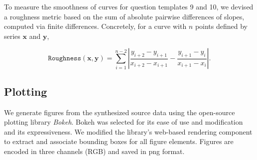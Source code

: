 \documentclass{article} \usepackage{iclr2018_workshop,times}
\begin{document}
To measure the smoothness of curves for question templates 9 and 10, we devised a roughness metric based on the sum of absolute pairwise differences of slopes, computed via finite differences. Concretely, for a curve with $n$ points defined by series $\mathbf{x}$ and $\mathbf{y}$,

\[\mathtt{Roughness}(\mathbf{x},\mathbf{y})= \displaystyle\sum\limits_{i=1}^{n-2} \left\lvert \dfrac{y_{i+2} - y_{i+1}}{x_{i+2} - x_{i+1}} - \dfrac{y_{i+1} - y_{i}}{x_{i+1} - x_{i}}\right\rvert. \]

\subsection{Plotting}
We generate figures from the synthesized source data using the open-source plotting library \emph{Bokeh}. Bokeh was selected for its ease of use and modification and its expressiveness. We modified the library's web-based rendering component to extract and associate bounding boxes for all figure elements. Figures are encoded in three channels (RGB) and saved in \gls{png} format.
\end{document}
